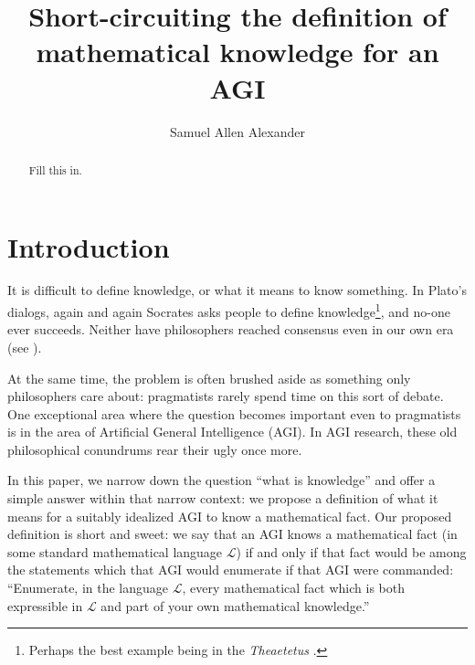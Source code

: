 \documentclass[runningheads]{llncs}
\begin{document}
\title{Short-circuiting the definition of mathematical knowledge for an AGI
}


\author{Samuel Allen
Alexander}



\maketitle

\begin{abstract}
Fill this in.
\end{abstract}

\section{Introduction}

It is difficult to define knowledge, or what it means to know something.
In Plato's dialogs, again and again Socrates asks people to define
knowledge\footnote{Perhaps the best example being in the \emph{Theaetetus}
\cite{theaetetus}.}, and no-one ever succeeds. Neither have philosophers
reached consensus even in our own era (see \cite{sep-knowledge-analysis}).

At the same time, the problem is often brushed aside as something only
philosophers care about: pragmatists rarely spend time
on this sort of debate. One exceptional area where the question becomes
important even to pragmatists is in the area of Artificial General Intelligence
(AGI). In AGI research, these old philosophical conundrums rear their ugly
once more.

In this paper, we narrow down the question ``what is knowledge'' and offer
a simple answer within that narrow context:
we propose a definition of what it means for a suitably idealized AGI to know
a mathematical fact. Our proposed definition is short and sweet: we say that
an AGI knows a mathematical fact (in some standard mathematical language $\mathscr L$)
if and only if that fact would be among the statements which that AGI would
enumerate if that AGI were commanded:
``Enumerate, in the language $\mathscr L$, every mathematical fact which
is both expressible in $\mathscr L$ and part of your own mathematical knowledge.''
\end{document}
